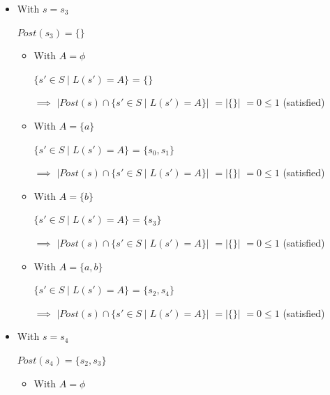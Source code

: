 \documentclass[a4paper,12pt]{article}
\begin{document}
\begin{itemize}
\begin{itemize}
\begin{itemize}
                 $\implies$ $\left|Post(s) \cap \{s' \in S \mid L(s') = A\}\right|$ $= \left|\{\}\right|$ $= 0 \leq 1$ (satisfied)
                \item[-] With $A = \{a, b\}$ 
                
                 $\{s' \in S \mid L(s') = A\}$ = $\{s_2, s_4\}$

                 $\implies$ $\left|Post(s) \cap \{s' \in S \mid L(s') = A\}\right|$ $= \left|\{s_4\}\right|$ $= 1 \leq 1$ (satisfied)
            \end{itemize}
        \item With $s = s_3$
        
            $Post(s_3) = \{\}$

            \begin{itemize}
                \item[-] With $A = \phi$
                
                $\{s' \in S \mid L(s') = A\}$ = $\{\}$

                $\implies$  $\left|Post(s) \cap \{s' \in S \mid L(s') = A\}\right|$ $= \left|\{\}\right|$ $= 0 \leq 1$ (satisfied)
                \item[-] With $A = \{a\}$
                
                $\{s' \in S \mid L(s') = A\}$ = $\{s_0, s_1\}$

                $\implies$ $\left|Post(s) \cap \{s' \in S \mid L(s') = A\}\right|$ $= \left|\{\}\right|$ $= 0 \leq 1$ (satisfied)
                \item[-] With $A = \{b\}$
            
                 $\{s' \in S \mid L(s') = A\}$ = $\{s_3\}$

                 $\implies$ $\left|Post(s) \cap \{s' \in S \mid L(s') = A\}\right|$ $= \left|\{\}\right|$ $= 0 \leq 1$ (satisfied)
                \item[-] With $A = \{a, b\}$ 
                
                 $\{s' \in S \mid L(s') = A\}$ = $\{s_2, s_4\}$

                 $\implies$ $\left|Post(s) \cap \{s' \in S \mid L(s') = A\}\right|$ $= \left|\{\}\right|$ $= 0 \leq 1$ (satisfied)
            \end{itemize}
        \item With $s = s_4$
          
            $Post(s_4) = \{s_2, s_3\}$

            \begin{itemize}
                \item[-] With $A = \phi$
                

\end{itemize}
\end{itemize}
\end{itemize}
\end{document}

